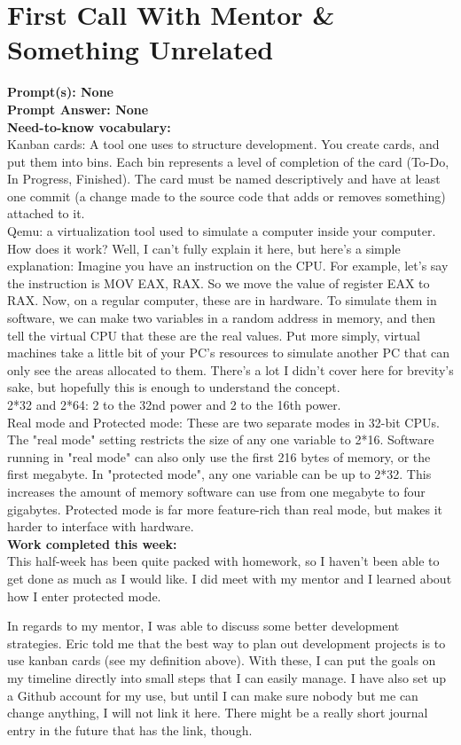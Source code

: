 \documentclass[11pt]{article}
\begin{document}
\section{First Call With Mentor \& Something Unrelated}
\textbf{Prompt(s): None}\\
\textbf{Prompt Answer: None}\\
\textbf{Need-to-know vocabulary:}\\
Kanban cards: A tool one uses to structure development. You create cards, and put them into bins. Each bin represents a level of completion of the card (To-Do, In Progress, Finished). The card must be named descriptively and have at least one commit (a change made to the source code that adds or removes something) attached to it. \\
Qemu: a virtualization tool used to simulate a computer inside your computer. How does it work? Well, I can't fully explain it here, but here's a simple explanation: Imagine you have an instruction on the CPU. For example, let's say the instruction is MOV EAX, RAX. So we move the value of register EAX to RAX. Now, on a regular computer, these are in hardware. To simulate them in software, we can make two variables in a random address in memory, and then tell the virtual CPU that these are the real values. Put more simply, virtual machines take a little bit of your PC's resources to simulate another PC that can only see the areas allocated to them. There's a lot I didn't cover here for brevity's sake, but hopefully this is enough to understand the concept.\\
2*32 and 2*64: 2 to the 32nd power and 2 to the 16th power. \\
Real mode and Protected mode: These are two separate modes in 32-bit CPUs. The "real mode" setting restricts the size of any one variable to 2*16. Software running in "real mode" can also only use the first 216 bytes of memory, or the first megabyte. In "protected mode", any one variable can be up to 2*32. This increases the amount of memory software can use from one megabyte to four gigabytes. Protected mode is far more feature-rich than real mode, but makes it harder to interface with hardware.\\
\textbf{Work completed this week:}\\
This half-week has been quite packed with homework, so I haven't been able to get done as much as I would like. I did meet with my mentor and I learned about how I enter protected mode. 

In regards to my mentor, I was able to discuss some better development strategies. Eric told me that the best way to plan out development projects is to use kanban cards (see my definition above). With these, I can put the goals on my timeline directly into small steps that I can easily manage. I have also set up a Github account for my use, but until I can make sure nobody but me can change anything, I will not link it here. There might be a really short journal entry in the future that has the link, though. 
\end{document}
